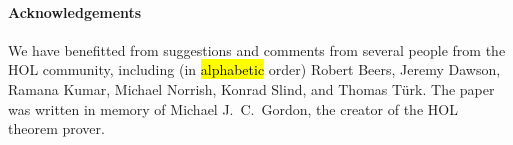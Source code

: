 

\paragraph{Acknowledgements}

We have benefitted from suggestions and comments 
from several people from the HOL
community, including (in \hl{alphabetic} order) Robert Beers, Jeremy Dawson,
Ramana Kumar,
Michael Norrish, 
Konrad Slind, and
Thomas T\"{u}rk.
%
The 
paper was written in memory of Michael J.~C.~Gordon, the creator of the HOL theorem prover.
